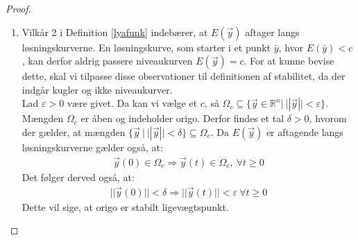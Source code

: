 \begin{proof}

\begin{enumerate}
  \item Vilkår 2 i Definition \ref{lyafunk} indebærer, at $E(\vec{y})$ aftager langs løsningskurverne. En løsningskurve, som starter i et punkt $\bar{y}$, hvor $E(\bar{y})<c$, kan derfor aldrig passere niveaukurven $E(\vec{y})=c$. For at kunne bevise dette, skal vi tilpasse disse observationer til definitionen af stabilitet, da der indgår kugler og ikke niveaukurver.\\
  \hfill \break
  Lad $\varepsilon>0$ være givet. Da kan vi vælge et $c$, så $\Omega_c \subseteq \{\vec{y}\in \mathbb{R}^n | \ ||\vec{y}||<\varepsilon \}$. Mængden $\Omega_c$ er åben og indeholder origo. Derfor findes et tal $\delta > 0$, hvorom der gælder, at mængden $\{\vec{y} \ |\ ||\vec{y}||<\delta\} \subseteq \Omega_c$.
  Da $E(\vec{y})$ er aftagende langs løsningskurverne gælder også, at:
  \begin{align*}
  \vec{y}(0)\in \Omega_c \Rightarrow \vec{y}(t) \in \Omega_c, \ \forall t\geq 0
  \end{align*}
  Det følger derved også, at:
  \begin{align*}
  ||\vec{y}(0)||<\delta \Rightarrow ||\vec{y}(t)|| < \varepsilon \ \forall t \geq 0
  \end{align*}
  Dette vil sige, at origo er stabilt ligevægtspunkt.
  

\end{enumerate}
\end{proof}
